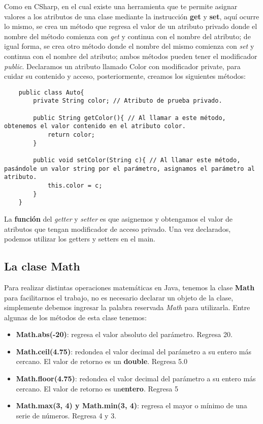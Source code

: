 Como en CSharp, en el cual existe una herramienta que te permite asignar valores a los atributos de una clase mediante la instrucción \textbf{get} y \textbf{set}, aquí ocurre lo mismo, se crea un método que regresa el valor de un atributo privado donde el nombre del método comienza con \textit{get} y continua con el nombre del atributo; de igual forma, se crea otro método donde el nombre del mismo comienza con \textit{set} y continua con el nombre del atributo; ambos métodos pueden tener el modificador \textit{public}. Declaramos un atributo llamado Color con modificador private, para cuidar su contenido y acceso, posteriormente, creamos los siguientes métodos:
\begin{lstlisting}
    public class Auto{
        private String color; // Atributo de prueba privado.
        
        public String getColor(){ // Al llamar a este método, obtenemos el valor contenido en el atributo color.
            return color;
        }
        
        public void setColor(String c){ // Al llamar este método, pasándole un valor string por el parámetro, asignamos el parámetro al atributo.
            this.color = c;
        }
    }
\end{lstlisting}

La \textbf{función} del \textit{getter} y \textit{setter} es que asignemos y obtengamos el valor de atributos que tengan modificador de acceso privado. Una vez declarados, podemos utilizar los getters y setters en el main.


\subsection{La clase Math}

Para realizar distintas operaciones matemáticas en Java, tenemos la clase \textbf{Math} para facilitarnos el trabajo, no es necesario declarar un objeto de la clase, simplemente debemos ingresar la palabra reservada \textit{Math} para utilizarla. Entre algunas de los métodos de esta clase tenemos:
\begin{itemize}
    \item \textbf{Math.abs(-20)}: regresa el valor absoluto del parámetro. Regresa 20.
    \item \textbf{Math.ceil(4.75)}: redondea el valor decimal del parámetro a su entero más cercano. El valor de retorno es un \textbf{double}. Regresa 5.0
    \item \textbf{Math.floor(4.75)}: redondea el valor decimal del parámetro a su entero más cercano. El valor de retorno es un\textbf{entero}. Regresa 5
    \item \textbf{Math.max(3, 4) y Math.min(3, 4)}: regresa el mayor o mínimo de una serie de números. Regresa 4 y 3.
\end{itemize}


